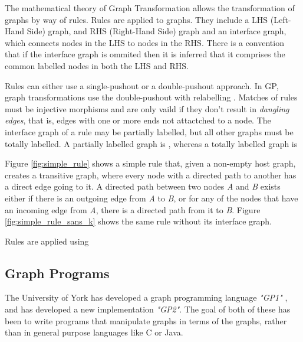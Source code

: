 \documentclass{UoYCSproject}
\begin{document}
The mathematical theory of Graph Transformation allows the transformation of graphs by way of rules. Rules are applied to graphs. They include a LHS (Left-Hand Side) graph, and RHS (Right-Hand Side) graph and an interface graph, which connects nodes in the LHS to nodes in the RHS. There is a convention that if the interface graph is ommited then it is inferred that it comprises the common labelled nodes in both the LHS and RHS.

Rules can either use a single-pushout or a double-pushout approach. In GP, graph transformations use the double-pushout with relabelling \cite[p. 100]{gp1}. Matches of rules must be injective morphisms and are only vaild if they don't result in \emph{dangling edges}, that is, edges with one or more ends not attactched to a node. The interface graph of a rule may be partially labelled, but all other graphs must be totally labelled. A partially labelled graph is %
, whereas a totally labelled graph is %

Figure \ref{fig:simple_rule} shows a simple rule that, given a non-empty host graph, creates a transitive graph, where every node with a directed path to another has a direct edge going to it. A directed path between two nodes \emph{A} and \emph{B} exists either if there is an outgoing edge from \emph{A} to \emph{B}, or for any of the nodes that have an incoming edge from \emph{A}, there is a directed path from it to \emph{B}.
Figure \ref{fig:simple_rule_sans_k} shows the same rule without its interface graph.



Rules are applied using %




\subsection{Graph Programs}
The University of York has developed a graph programming language \emph{"GP1"} \cite{gp1}, and has developed a new implementation \emph{"GP2"}. The goal of both of these has been to write programs that manipulate graphs in terms of the graphs, rather than in general purpose languages like C or Java. 
\end{document}
